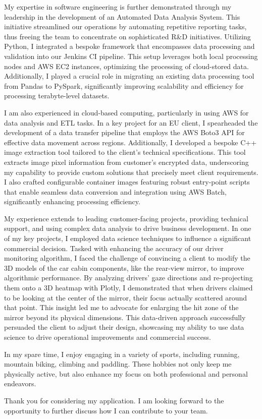 \documentclass[11pt, a4paper]{awesome-cv}
\begin{document}
\begin{cvletter}
My expertise in software engineering is further demonstrated through my leadership in the development of an Automated Data Analysis System. This initiative streamlined our operations by automating repetitive reporting tasks, thus freeing the team to concentrate on sophisticated R\&D initiatives. Utilizing Python, I integrated a bespoke framework that encompasses data processing and validation into our Jenkins CI pipeline. This setup leverages both local processing nodes and AWS EC2 instances, optimizing the processing of cloud-stored data. Additionally, I played a crucial role in migrating an existing data processing tool from Pandas to PySpark, significantly improving scalability and efficiency for processing terabyte-level datasets.

I am also experienced in cloud-based computing, particularly in using AWS for data analysis and ETL tasks. In a key project for an EU client, I spearheaded the development of a data transfer pipeline that employs the AWS Boto3 API for effective data movement across regions. Additionally, I developed a bespoke C++ image extraction tool tailored to the client's technical specifications. This tool extracts image pixel information from customer's encrypted data, underscoring my capability to provide custom solutions that precisely meet client requirements. I also crafted configurable container images featuring robust entry-point scripts that enable seamless data conversion and integration using AWS Batch, significantly enhancing processing efficiency.

My experience extends to leading customer-facing projects, providing technical support, and using complex data analysis to drive business development. In one of my key projects, I employed data science techniques to influence a significant commercial decision. Tasked with enhancing the accuracy of our driver monitoring algorithm, I faced the challenge of convincing a client to modify the 3D models of the car cabin components, like the rear-view mirror, to improve algorithmic performance. By analyzing drivers' gaze directions and re-projecting them onto a 3D heatmap with Plotly, I demonstrated that when drivers claimed to be looking at the center of the mirror, their focus actually scattered around that point. This insight led me to advocate for enlarging the hit zone of the mirror beyond its physical dimensions. This data-driven approach successfully persuaded the client to adjust their design, showcasing my ability to use data science to drive operational improvements and commercial success.

In my spare time, I enjoy engaging in a variety of sports, including running, mountain biking, climbing and paddling. These hobbies not only keep me physically active, but also enhance my focus on both professional and personal endeavors. 

Thank you for considering my application. I am looking forward to the opportunity to further discuss how I can contribute to your team.

\end{cvletter}


\makeletterclosing
\end{document}
